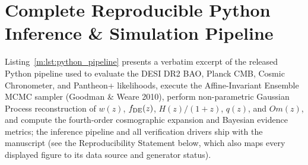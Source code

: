 \documentclass[aps,prd,preprint,superscriptaddress,nofootinbib]{revtex4-2}
\begin{document}
\section{Complete Reproducible Python Inference \& Simulation Pipeline}

Listing~\ref{m:lst:python_pipeline} presents a verbatim excerpt of the released Python pipeline used to evaluate the DESI DR2 BAO, Planck CMB, Cosmic Chronometer, and Pantheon+ likelihoods, execute the Affine-Invariant Ensemble MCMC sampler (Goodman \& Weare 2010), perform non-parametric Gaussian Process reconstruction of $w(z)$, $f_{\rm DE}(z)$, $H(z)/(1+z)$, $q(z)$, and $Om(z)$, and compute the fourth-order cosmographic expansion and Bayesian evidence metrics; the inference pipeline and all verification drivers ship with the manuscript (see the Reproducibility Statement below, which also maps every displayed figure to its data source and generator status).
\end{document}
